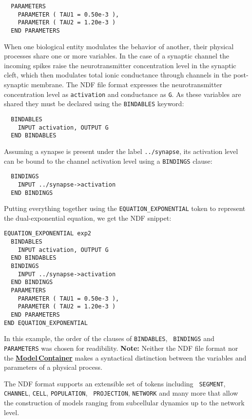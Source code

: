 \documentclass[12pt]{article}
\begin{document}
\begin{verbatim}
  PARAMETERS
    PARAMETER ( TAU1 = 0.50e-3 ),
    PARAMETER ( TAU2 = 1.20e-3 )
  END PARAMETERS
\end{verbatim}

When one biological entity modulates the behavior of another,
their physical processes share one or more variables.  In the case of
a synaptic channel the incoming spikes raise the neurotransmitter
concentration level in the synaptic cleft, which then modulates total
ionic conductance through channels in the post-synaptic membrane.  The NDF file format expresses the
neurotransmitter concentration level as {\tt activation} and
conductance as {\tt G}.  As these variables  are shared they must be declared using
the {\tt BINDABLES} keyword:
\begin{verbatim}
  BINDABLES
    INPUT activation, OUTPUT G
  END BINDABLES
\end{verbatim}
Assuming a synapse is present under the label {\tt ../synapse}, its
activation level can be bound to the channel activation level using a
{\tt BINDINGS} clause:
\begin{verbatim}
  BINDINGS
    INPUT ../synapse->activation
  END BINDINGS
\end{verbatim}

Putting everything together using the {\tt EQUATION\_EXPONENTIAL}
token to represent the dual-exponential equation, we get the NDF
snippet:
\begin{verbatim}
EQUATION_EXPONENTIAL exp2
  BINDABLES
    INPUT activation, OUTPUT G
  END BINDABLES
  BINDINGS
    INPUT ../synapse->activation
  END BINDINGS
  PARAMETERS
    PARAMETER ( TAU1 = 0.50e-3 ),
    PARAMETER ( TAU2 = 1.20e-3 )
  END PARAMETERS
END EQUATION_EXPONENTIAL
\end{verbatim}

In this example, the order of the clauses of {\tt BINDABLES}, {\tt
  BINDINGS} and {\tt PARAMETERS} was chosen for readibility.  
{\bf Note:} Neither the NDF file format nor
the \href{../model-container/model-container.tex}{\bf Model\,Container}
makes a syntactical distinction between the variables and parameters of a
physical process.

The NDF format supports an extensible set of tokens including {\tt
  SEGMENT}, {\tt CHANNEL}, {\tt CELL}, {\tt POPULATION}, {\tt
  PROJECTION}, {\tt NETWORK} and many more that allow the construction of
models ranging from subcellular dynamics up to the network level.
\end{document}
